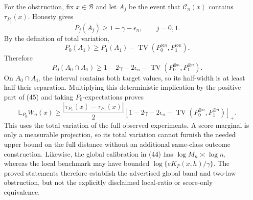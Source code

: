 For the obstruction, fix \(x\in\mathcal B\) and let \(A_j\) be the event that \(\mathcal C_n(x)\) contains \(\tau_{P_j}(x)\).  Honesty gives
\[
 P_j(A_j)\ge1-\gamma-\epsilon_n,
 \qquad j=0,1.
\]
By the definition of total variation,
\[
 P_0(A_1)\ge P_1(A_1)-\operatorname{TV}(P_0^{\otimes n},P_1^{\otimes n}).
\]
Therefore
\[
 P_0(A_0\cap A_1)
 \ge1-2\gamma-2\epsilon_n-
 \operatorname{TV}(P_0^{\otimes n},P_1^{\otimes n}). \tag{45}
\]
On \(A_0\cap A_1\), the interval contains both target values, so its half-width is at least half their separation.  Multiplying this deterministic implication by the positive part of (45) and taking \(P_0\)-expectations proves
\[
 \mathbb E_{P_0}W_n(x)\ge\frac{|\tau_{P_1}(x)-\tau_{P_0}(x)|}{2}
 \left[1-2\gamma-2\epsilon_n-
 \operatorname{TV}(P_0^{\otimes n},P_1^{\otimes n})\right]_+.
\]
This uses the total variation of the full observed experiments.  A score marginal is only a measurable projection, so its total variation cannot furnish the needed upper bound on the full distance without an additional same-class outcome construction.  Likewise, the global calibration in (44) has \(\log M_n\asymp\log n\), whereas the local benchmark may have bounded \(\log\{eK_P(x,h)/\gamma\}\).  The proved statements therefore establish the advertised global band and two-law obstruction, but not the explicitly disclaimed local-ratio or score-only equivalence.